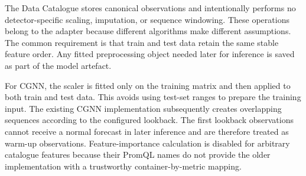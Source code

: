 The Data Catalogue stores canonical observations and intentionally performs no detector-specific scaling, imputation, or sequence windowing. These operations belong to the adapter because different algorithms make different assumptions. The common requirement is that train and test data retain the same stable feature order. Any fitted preprocessing object needed later for inference is saved as part of the model artefact.

\begin{table}[H]
    \centering
    \caption{Preprocessing and input handling of the implemented detector adapters.}
    \label{tab:detector_preprocessing}
\end{table}

For CGNN, the scaler is fitted only on the training matrix and then applied to both train and test data. This avoids using test-set ranges to prepare the training input. The existing CGNN implementation subsequently creates overlapping sequences according to the configured lookback. The first lookback observations cannot receive a normal forecast in later inference and are therefore treated as warm-up observations. Feature-importance calculation is disabled for arbitrary catalogue features because their PromQL names do not provide the older implementation with a trustworthy container-by-metric mapping.

